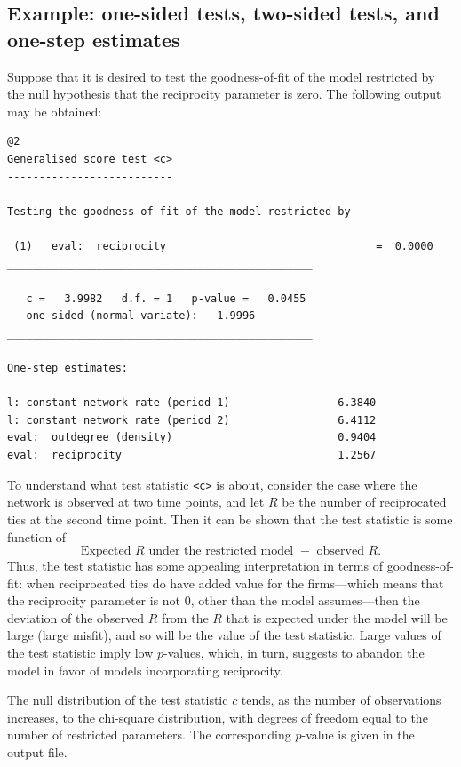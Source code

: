 \documentclass[a4paper,fleqn,11pt]{article}
\newcommand{\+}{\, + \,}
\begin{document}
\subsection{Example: one-sided tests, two-sided tests, and one-step estimates}
\label{example}

Suppose that it is desired to test the goodness-of-fit of the model
restricted by the null hypothesis that the reciprocity parameter is zero.
The following output may be obtained:


{\footnotesize
\begin{verbatim}
@2
Generalised score test <c>
--------------------------

Testing the goodness-of-fit of the model restricted by

 (1)   eval:  reciprocity                                 =  0.0000
________________________________________________

   c =   3.9982   d.f. = 1   p-value =   0.0455
   one-sided (normal variate):   1.9996
________________________________________________

One-step estimates:

l: constant network rate (period 1)                 6.3840
l: constant network rate (period 2)                 6.4112
eval:  outdegree (density)                          0.9404
eval:  reciprocity                                  1.2567
\end{verbatim}
}
To understand what test statistic {\tt <c>} is about, consider the case
where the network is observed at two time points, and let $R$
be the number of reciprocated ties at the second time point. Then it
can be shown that the test statistic is some function of
\[
  \mbox{Expected $R$ under the restricted model } - \mbox{ observed } R.
\]
Thus, the test statistic has some appealing interpretation in terms
of goodness-of-fit: when reciprocated ties do have added value for
the firms---which means that the reciprocity parameter is not 0,
other than the model assumes---then the deviation of the observed
$R$ from the $R$ that is expected under the model will be large
(large misfit), and so will be the value of the test statistic.
Large values of the test statistic imply low $p$-values, which, in
turn, suggests to abandon the model in favor of models incorporating
reciprocity.

The null distribution of the test statistic $c$ tends,
as the number of observations increases, to the chi-square
distribution, with degrees of freedom equal to the
number of restricted parameters. The corresponding $p$-value is
given in the output file.
\end{document}
